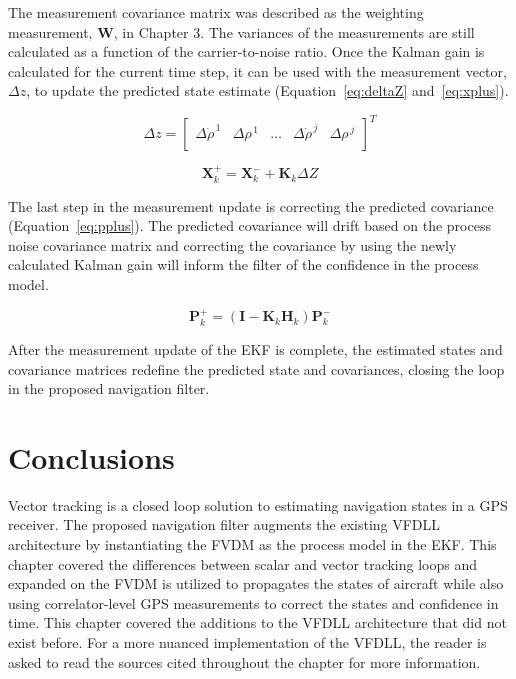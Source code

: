 The measurement covariance matrix was described as the weighting measurement, \(\mathbf{W}\), in Chapter 3. The variances of the measurements are still calculated as a function of the carrier-to-noise ratio. Once the Kalman gain is calculated for the current time step, it can be used with the measurement vector, \(\Delta z\), to update the predicted state estimate (Equation~\ref{eq:deltaZ} and~\ref{eq:xplus}).

\begin{equation}\label{eq:deltaZ}
    \Delta z = \begin{bmatrix}
        \Delta\dot{\rho}^{\,1} & \Delta{\rho}^{\,1} & \hdots & \Delta\dot{\rho}^{\,j} & \Delta{\rho}^{\,j} \\
    \end{bmatrix}^T
\end{equation}

\begin{equation}\label{eq:xplus}
    \mathbf{X}_k^+ = \mathbf{X}^-_k + \mathbf{K}_k\Delta Z
\end{equation}

The last step in the measurement update is correcting the predicted covariance (Equation~\ref{eq:pplus}). The predicted covariance will drift based on the process noise covariance matrix and correcting the covariance by using the newly calculated Kalman gain will inform the filter of the confidence in the process model. 

\begin{equation}\label{eq:pplus}
    \mathbf{P}^+_k = \left(\mathbf{I} - \mathbf{K}_k\mathbf{H}_k\right)\mathbf{P}^-_k
\end{equation}

After the measurement update of the EKF is complete, the estimated states and covariance matrices redefine the predicted state and covariances, closing the loop in the proposed navigation filter.

\section{Conclusions}
Vector tracking is a closed loop solution to estimating navigation states in a GPS receiver. The proposed navigation filter augments the existing VFDLL architecture by instantiating the FVDM as the process model in the EKF\@. This chapter covered the differences between scalar and vector tracking loops and expanded on the FVDM is utilized to propagates the states of aircraft while also using correlator-level GPS measurements to correct the states and confidence in time. This chapter covered the additions to the VFDLL architecture that did not exist before. For a more nuanced implementation of the VFDLL, the reader is asked to read the sources cited throughout the chapter for more information.
